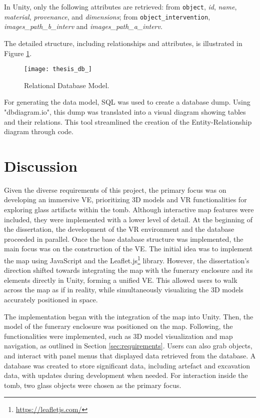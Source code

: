 In Unity, only the following attributes are retrieved: from \texttt{object}, \emph{id}, \emph{name}, \emph{material}, \emph{provenance}, and \emph{dimensions}; from \texttt{object\_intervention}, \emph{images\_path\_b\_interv} and \emph{images\_path\_a\_interv}.

The detailed structure, including relationships and attributes, is illustrated in Figure \ref{fig:database}.

\begin{figure}[h!]
    \centering
    \texttt{[image: thesis\_db\_]}
    \caption{Relational Database Model.} 
    \label{fig:database}
\end{figure}


For generating the data model, SQL was used to create a database dump.
Using "dbdiagram.io", this dump was translated into a visual diagram showing tables and their relations. This tool streamlined the creation of the Entity-Relationship diagram through code.

\section{Discussion} %
\label{sec:discussion_design}


Given the diverse requirements of this project, the primary focus was on developing an immersive \gls{VE}, prioritizing \gls{3D} models and \gls{VR} functionalities for exploring glass artifacts within the tomb. Although interactive map features were included, they were implemented with a lower level of detail.
At the beginning of the dissertation, the development of the \gls{VR} environment and the database proceeded in parallel. Once the base database structure was implemented, the main focus was on the construction of the \gls{VE}. The initial idea was to implement the map using JavaScript and the Leaflet.js\footnote{\url{https://leafletjs.com/}} library. However, the dissertation's direction shifted towards integrating the map with the funerary enclosure and its elements directly in Unity, forming a unified \gls{VE}. This allowed users to walk across the map as if in reality, while simultaneously visualizing the \gls{3D} models accurately positioned in space.

The implementation began with the integration of the map into Unity. 
Then, the model of the funerary enclosure was positioned on the map.
Following, the functionalities were implemented, such as \gls{3D} model visualization and map navigation, as outlined in Section \ref{sec:requirements}. 
Users can also grab objects, and interact with panel menus that displayed data retrieved from the database. 
A database was created to store significant data, including artefact and excavation data, with updates during development when needed. For interaction inside the tomb, two glass objects were chosen as the primary focus.

